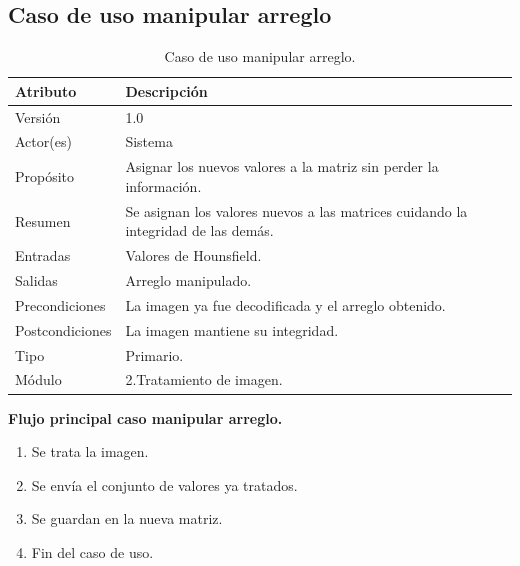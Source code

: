 \documentclass[12pt]{report}
\begin{document}
\subsection{Caso de uso manipular arreglo}
\begin{table}[H]
\begin{center}
\begin{tabular}{|p{25mm}|p{60mm}|}
\hline
Atributo & Descripción\\
\hline \hline 
Versión & 1.0\\
\hline
Actor(es) & Sistema\\
\hline
Propósito & Asignar los nuevos valores a la matriz sin perder la información.\\
\hline
Resumen & Se asignan los valores nuevos a las matrices cuidando la integridad de las demás.\\
\hline
Entradas & Valores de Hounsfield.\\
\hline
Salidas & Arreglo manipulado.\\
\hline
Precondiciones & La imagen ya fue decodificada y el arreglo obtenido.\\
\hline
Postcondiciones & La imagen mantiene su integridad.\\
\hline
Tipo & Primario.\\
\hline 
Módulo & 2.Tratamiento de imagen.\\
\hline
\end{tabular}
\caption{Caso de uso manipular arreglo.}
\end{center}
\end{table}

\textbf{Flujo principal caso manipular arreglo. }
\begin{enumerate}
\item Se trata la imagen.
\item Se envía el conjunto de valores ya tratados.
\item Se guardan en la nueva matriz.
\item Fin del caso de uso.
\end{enumerate}
\end{document}
